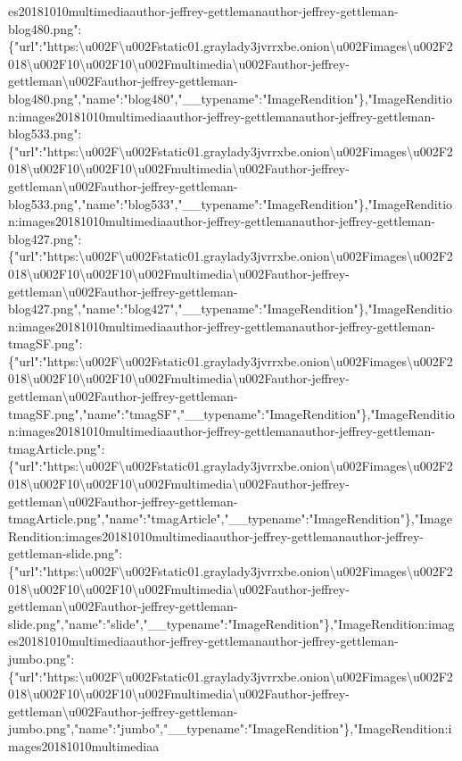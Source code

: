 es20181010multimediaauthor-jeffrey-gettlemanauthor-jeffrey-gettleman-blog480.png":\{"url":"https:\textbackslash{}u002F\textbackslash{}u002Fstatic01.graylady3jvrrxbe.onion\textbackslash{}u002Fimages\textbackslash{}u002F2018\textbackslash{}u002F10\textbackslash{}u002F10\textbackslash{}u002Fmultimedia\textbackslash{}u002Fauthor-jeffrey-gettleman\textbackslash{}u002Fauthor-jeffrey-gettleman-blog480.png","name":"blog480","\_\_typename":"ImageRendition"\},"ImageRendition:images20181010multimediaauthor-jeffrey-gettlemanauthor-jeffrey-gettleman-blog533.png":\{"url":"https:\textbackslash{}u002F\textbackslash{}u002Fstatic01.graylady3jvrrxbe.onion\textbackslash{}u002Fimages\textbackslash{}u002F2018\textbackslash{}u002F10\textbackslash{}u002F10\textbackslash{}u002Fmultimedia\textbackslash{}u002Fauthor-jeffrey-gettleman\textbackslash{}u002Fauthor-jeffrey-gettleman-blog533.png","name":"blog533","\_\_typename":"ImageRendition"\},"ImageRendition:images20181010multimediaauthor-jeffrey-gettlemanauthor-jeffrey-gettleman-blog427.png":\{"url":"https:\textbackslash{}u002F\textbackslash{}u002Fstatic01.graylady3jvrrxbe.onion\textbackslash{}u002Fimages\textbackslash{}u002F2018\textbackslash{}u002F10\textbackslash{}u002F10\textbackslash{}u002Fmultimedia\textbackslash{}u002Fauthor-jeffrey-gettleman\textbackslash{}u002Fauthor-jeffrey-gettleman-blog427.png","name":"blog427","\_\_typename":"ImageRendition"\},"ImageRendition:images20181010multimediaauthor-jeffrey-gettlemanauthor-jeffrey-gettleman-tmagSF.png":\{"url":"https:\textbackslash{}u002F\textbackslash{}u002Fstatic01.graylady3jvrrxbe.onion\textbackslash{}u002Fimages\textbackslash{}u002F2018\textbackslash{}u002F10\textbackslash{}u002F10\textbackslash{}u002Fmultimedia\textbackslash{}u002Fauthor-jeffrey-gettleman\textbackslash{}u002Fauthor-jeffrey-gettleman-tmagSF.png","name":"tmagSF","\_\_typename":"ImageRendition"\},"ImageRendition:images20181010multimediaauthor-jeffrey-gettlemanauthor-jeffrey-gettleman-tmagArticle.png":\{"url":"https:\textbackslash{}u002F\textbackslash{}u002Fstatic01.graylady3jvrrxbe.onion\textbackslash{}u002Fimages\textbackslash{}u002F2018\textbackslash{}u002F10\textbackslash{}u002F10\textbackslash{}u002Fmultimedia\textbackslash{}u002Fauthor-jeffrey-gettleman\textbackslash{}u002Fauthor-jeffrey-gettleman-tmagArticle.png","name":"tmagArticle","\_\_typename":"ImageRendition"\},"ImageRendition:images20181010multimediaauthor-jeffrey-gettlemanauthor-jeffrey-gettleman-slide.png":\{"url":"https:\textbackslash{}u002F\textbackslash{}u002Fstatic01.graylady3jvrrxbe.onion\textbackslash{}u002Fimages\textbackslash{}u002F2018\textbackslash{}u002F10\textbackslash{}u002F10\textbackslash{}u002Fmultimedia\textbackslash{}u002Fauthor-jeffrey-gettleman\textbackslash{}u002Fauthor-jeffrey-gettleman-slide.png","name":"slide","\_\_typename":"ImageRendition"\},"ImageRendition:images20181010multimediaauthor-jeffrey-gettlemanauthor-jeffrey-gettleman-jumbo.png":\{"url":"https:\textbackslash{}u002F\textbackslash{}u002Fstatic01.graylady3jvrrxbe.onion\textbackslash{}u002Fimages\textbackslash{}u002F2018\textbackslash{}u002F10\textbackslash{}u002F10\textbackslash{}u002Fmultimedia\textbackslash{}u002Fauthor-jeffrey-gettleman\textbackslash{}u002Fauthor-jeffrey-gettleman-jumbo.png","name":"jumbo","\_\_typename":"ImageRendition"\},"ImageRendition:images20181010multimediaa